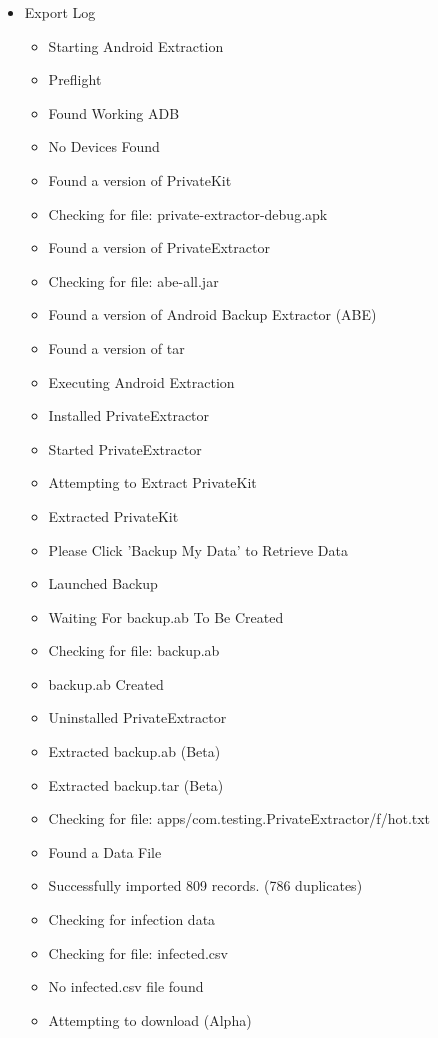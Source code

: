 \documentclass{article}
\begin{document}
\begin{itemize}
   \item  Export Log
   \begin{itemize}
			\item	{Starting Android Extraction}
			\item	{Preflight}
			\item	{Found Working ADB}
			\item	{No Devices Found}
			\item	{Found a version of PrivateKit}
			\item	{Checking for file: private-extractor-debug.apk}
			\item	{Found a version of PrivateExtractor}
			\item	{Checking for file: abe-all.jar}
			\item	{Found a version of Android Backup Extractor (ABE)}
			\item	{Found a version of tar}
			\item	{Executing Android Extraction}
			\item	{Installed PrivateExtractor}
			\item	{Started PrivateExtractor}
			\item	{Attempting to Extract PrivateKit}
			\item	{Extracted PrivateKit}
			\item	{Please Click 'Backup My Data' to Retrieve Data}
			\item	{Launched Backup}
			\item	{Waiting For backup.ab To Be Created}
			\item	{Checking for file: backup.ab}
			\item	{backup.ab Created}
			\item	{Uninstalled PrivateExtractor}
			\item	{Extracted backup.ab (Beta)}
			\item	{Extracted backup.tar (Beta)}
			\item	{Checking for file: apps/com.testing.PrivateExtractor/f/hot.txt}
			\item	{Found a Data File}
			\item	{Successfully imported 809 records. (786 duplicates)}
			\item	{Checking for infection data}
			\item	{Checking for file: infected.csv}
			\item	{No infected.csv file found}
			\item	{Attempting to download (Alpha)}

\end{itemize}
\end{itemize}
\end{document}
